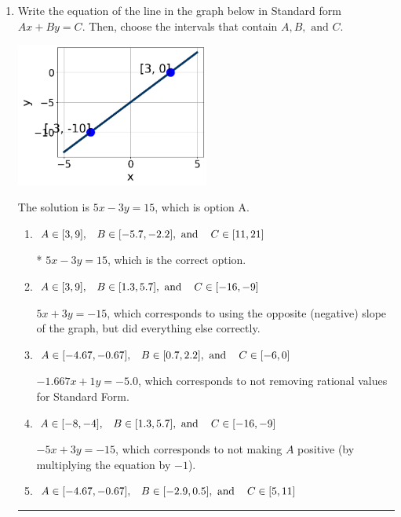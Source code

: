 \documentclass{extbook}[14pt]
\newcommand{\litem}[1]{\item #1

\rule{\textwidth}{0.4pt}}
\begin{document}
\begin{enumerate}\litem{
Write the equation of the line in the graph below in Standard form $Ax+By=C$. Then, choose the intervals that contain $A, B, \text{ and } C$.

\begin{center}
    \includegraphics[width=0.5\textwidth]{../Figures/linearGraphToStandardCopyA.png}
\end{center}



The solution is \( 5x - 3y = 15 \), which is option A.\begin{enumerate}[label=\Alph*.]
\item \( A \in [3, 9], \hspace{3mm} B \in [-5.7, -2.2], \text{ and } \hspace{3mm} C \in [11, 21] \)

* $5x - 3y = 15$, which is the correct option.
\item \( A \in [3, 9], \hspace{3mm} B \in [1.3, 5.7], \text{ and } \hspace{3mm} C \in [-16, -9] \)

 $5x + 3y = -15$, which corresponds to using the opposite (negative) slope of the graph, but did everything else correctly.
\item \( A \in [-4.67, -0.67], \hspace{3mm} B \in [0.7, 2.2], \text{ and } \hspace{3mm} C \in [-6, 0] \)

 $-1.667x + 1y = -5.0$, which corresponds to not removing rational values for Standard Form.
\item \( A \in [-8, -4], \hspace{3mm} B \in [1.3, 5.7], \text{ and } \hspace{3mm} C \in [-16, -9] \)

 $-5x + 3y = -15$, which corresponds to not making $A$ positive (by multiplying the equation by $-1$).
\item \( A \in [-4.67, -0.67], \hspace{3mm} B \in [-2.9, 0.5], \text{ and } \hspace{3mm} C \in [5, 11] \)


\end{enumerate}}
\end{enumerate}
\end{document}

